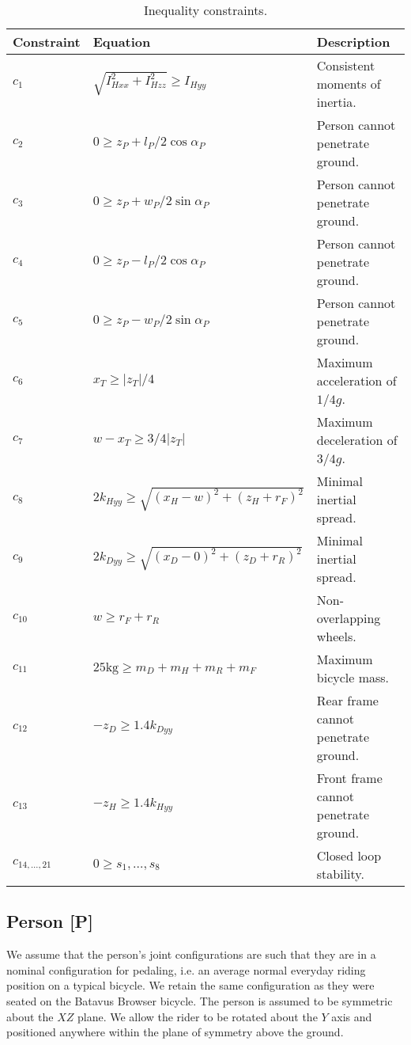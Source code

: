 \documentclass{bmd2019a}
\begin{document}
\begin{table}
  \caption{Inequality constraints.}
  \label{tab:inequality-constraints}
  \centering
  \begin{tabular}{lll}
    \toprule
    Constraint & Equation & Description \\
    \midrule
    $c_1$    & $\sqrt{I_{Hxx}^2+I_{Hzz}^2} \geq I_{Hyy}$           & Consistent moments of inertia. \\
    $c_2$    & $0 \geq z_P + l_P/2 \cos{\alpha_P}$                 & Person cannot penetrate ground. \\
    $c_3$    & $0 \geq z_P + w_P/2 \sin{\alpha_P}$                 & Person cannot penetrate ground. \\
    $c_4$    & $0 \geq z_P - l_P/2 \cos{\alpha_P}$                 & Person cannot penetrate ground. \\
    $c_5$    & $0 \geq z_P - w_P/2 \sin{\alpha_P}$                 & Person cannot penetrate ground. \\
    $c_6$    & $x_T \geq |z_T|/4$                                  & Maximum acceleration of $1/4g$. \\
    $c_7$    & $w-x_T \geq 3/4|z_T|$                               & Maximum deceleration of $3/4g$. \\
    $c_8$    & $2k_{Hyy} \geq \sqrt{(x_H - w)^2 + (z_H + r_F)^2}$  & Minimal inertial spread. \\
    $c_9$    & $2k_{Dyy} \geq \sqrt{(x_D - 0)^2 + (z_D + r_R)^2}$  & Minimal inertial spread. \\
    $c_{10}$ & $w \geq r_F +r_R$                                   & Non-overlapping wheels. \\
    $c_{11}$ & $25\si{\kg} \geq m_D + m_H + m_R + m_F$             & Maximum bicycle mass. \\
    $c_{12}$ & $-z_D \geq 1.4 k_{Dyy}$                             & Rear frame cannot penetrate ground. \\
    $c_{13}$ & $-z_H \geq 1.4 k_{Hyy}$                             & Front frame cannot penetrate ground. \\
    $c_{14,\ldots,21}$ & $0 \geq s_1,\ldots,s_8$                   & Closed loop stability. \\
    \bottomrule
  \end{tabular}
\end{table}

\subsection{Person [P]}
%
We assume that the person's joint configurations are such that they are in a
nominal configuration for pedaling, i.e. an average normal everyday riding
position on a typical bicycle. We retain the same configuration as they were
seated on the Batavus Browser bicycle. The person is assumed to be symmetric
about the $XZ$ plane. We allow the rider to be rotated about the $Y$ axis and
positioned anywhere within the plane of symmetry above the ground.
\end{document}
